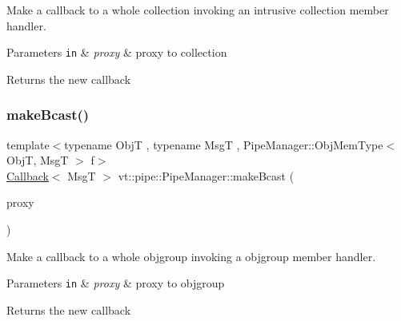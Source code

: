 Make a callback to a whole collection invoking an intrusive collection member handler. 


\begin{DoxyParams}[1]{Parameters}
\mbox{\tt in}  & {\em proxy} & proxy to collection\\
\hline
\end{DoxyParams}
\begin{DoxyReturn}{Returns}
the new callback 
\end{DoxyReturn}
\mbox{\label{structvt_1_1pipe_1_1_pipe_manager_a4d561c17ce6861401a32892223e434c9}} 
\subsubsection{\texorpdfstring{make\+Bcast()}{makeBcast()}\hspace{0.1cm}{\footnotesize\ttfamily [6/6]}}
{\footnotesize\ttfamily template$<$typename ObjT , typename MsgT , Pipe\+Manager\+::\+Obj\+Mem\+Type$<$ Obj\+T, Msg\+T $>$ f$>$ \\
\hyperlink{namespacevt_a36db99df4c973d48b1118a293fff533f}{Callback}$<$ MsgT $>$ vt\+::pipe\+::\+Pipe\+Manager\+::make\+Bcast (\begin{DoxyParamCaption}\item[{\hyperlink{structvt_1_1objgroup_1_1proxy_1_1_proxy}{objgroup\+::proxy\+::\+Proxy}$<$ ObjT $>$}]{proxy }\end{DoxyParamCaption})}



Make a callback to a whole objgroup invoking a objgroup member handler. 


\begin{DoxyParams}[1]{Parameters}
\mbox{\tt in}  & {\em proxy} & proxy to objgroup\\
\hline
\end{DoxyParams}
\begin{DoxyReturn}{Returns}
the new callback 
\end{DoxyReturn}
\mbox{\label{structvt_1_1pipe_1_1_pipe_manager_a51d552105b29056f146fecab880eb6c4}} 
